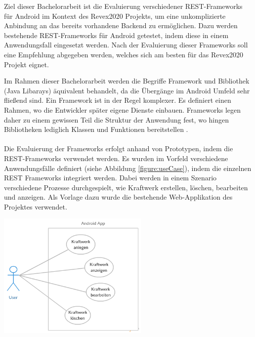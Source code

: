 Ziel dieser Bachelorarbeit ist die Evaluierung verschiedener REST-Frameworks für Android im Kontext des Revex2020 Projekts, um eine unkomplizierte Anbindung an das bereits vorhandene Backend zu ermöglichen. Dazu werden bestehende REST-Frameworks für Android getestet, indem diese in einem Anwendungsfall eingesetzt werden. Nach der Evaluierung dieser Frameworks soll eine Empfehlung abgegeben werden, welches sich am besten für das Revex2020 Projekt eignet.

Im Rahmen dieser Bachelorarbeit werden die Begriffe Framework und Bibliothek (Java Libarays) äquivalent behandelt, da die Übergänge im Android Umfeld sehr fließend sind. Ein Framework ist in der Regel komplexer. Es definiert einen Rahmen, wo die Entwickler später eigene Dienste einbauen. Frameworks legen daher zu einem gewissen Teil die Struktur der Anwendung fest, wo hingen Bibliotheken lediglich Klassen und Funktionen bereitstellen \cite{framework:library}.
\\\\
Die Evaluierung der Frameworks erfolgt anhand von Prototypen, indem die REST-Frameworks verwendet werden. Es wurden im Vorfeld verschiedene Anwendungsfälle definiert (siehe Abbildung \ref{figure:useCase}), indem die einzelnen REST Frameworks integriert werden. Dabei werden in einem Szenario verschiedene Prozesse durchgespielt, wie Kraftwerk erstellen, löschen, bearbeiten und anzeigen. Als Vorlage dazu wurde die bestehende Web-Applikation des Projektes verwendet.

\begin{minipage}{\textwidth} 
	\centering	
	\includegraphics[width=0.55\textwidth]{figures/kraftwerke_use_case.png}
	\label{figure:useCase}
	\vspace{2ex}
\end{minipage}

